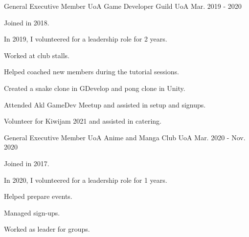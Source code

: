 

\begin{cventries}

  \cventry
    {General Executive Member} %
    {UoA Game Developer Guild} %
    {UoA} %
    {Mar. 2019 - 2020} %
    {
      \begin{cvitems} %
        \item {Joined in 2018.}
        \item {In 2019, I volunteered for a leadership role for 2 years.}
        \item {Worked at club stalls.}
        \item {Helped coached new members during the tutorial sessions.}
        \item {Created a snake clone in GDevelop and pong clone in Unity.}
        \item {Attended Akl GameDev Meetup and assisted in setup and signups.}
        \item {Volunteer for Kiwijam 2021 and assisted in catering.}
      \end{cvitems}
    }

  \cventry
    {General Executive Member} %
    {UoA Anime and Manga Club} %
    {UoA} %
    {Mar. 2020 - Nov. 2020} %
    {
      \begin{cvitems} %
        \item {Joined in 2017.}
        \item {In 2020, I volunteered for a leadership role for 1 years.}
        \item {Helped prepare events.}
        \item {Managed sign-ups.}
        \item {Worked as leader for groups.}
      \end{cvitems}
    }


\end{cventries}

